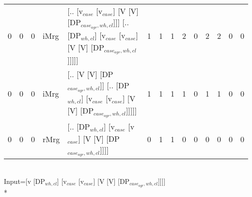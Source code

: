 \begin{tabularx}{\linewidth}{rrrlXrrrrrrrrr}
   0 &       0 &   0 & iMrg & [.. [v$_{case}$ [v$_{case}$] [V [V] [DP$_{case_{agr},wh,cl}$]]] [.. [DP$_{wh,cl}$] [v$_{case}$ [v$_{case}$] [V [V] [DP$_{case_{agr},wh,cl}$]]]]] &            1 &             1 &             1 &                  2 &              0 &           2 &           2 &                0 &             0 \\
   0 &       0 &   0 & iMrg & [.. [V [V] [DP$_{case_{agr},wh,cl}$]] [.. [DP$_{wh,cl}$] [v$_{case}$ [v$_{case}$] [V [V] [DP$_{case_{agr},wh,cl}$]]]]]                   &            1 &             1 &             1 &                  1 &              0 &           1 &           1 &                0 &             0 \\
   0 &       0 &   0 & rMrg & [.. [DP$_{wh,cl}$] [v$_{case}$ [v$_{case}$] [V [V] [DP$_{case_{agr},wh,cl}$]]]]                                                    &            0 &             1 &             1 &                  0 &              0 &           0 &           0 &                0 &             0 \\
\hline
\end{tabularx}\endgroup\\
\begingroup\scriptsize Input=[v [DP$_{wh,cl}$] [v$_{case}$ [v$_{case}$] [V [V] [DP$_{case_{agr},wh,cl}$]]]]\\*
